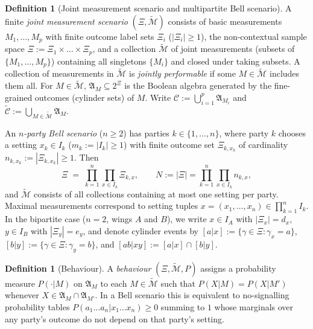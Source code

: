 \documentclass[11pt,a4paper]{article}
\theoremstyle{definition}
\newtheorem{definition}[theorem]{Definition}
\theoremstyle{remark}
\newcommand{\tcM}{\widetilde{\mathcal{M}}}
\newcommand{\cC}{\mathcal{C}}
\newcommand{\tcC}{\widetilde{\mathcal{C}}}
\newcommand{\EA}{\mathfrak{A}}
\begin{document}
\begin{definition}[Joint measurement scenario and multipartite Bell scenario]
A finite \emph{joint measurement scenario} $(\Xi, \tcM)$ consists of basic measurements $M_1, \dots, M_p$ with finite outcome label sets $\Xi_i$ ($|\Xi_i| \ge 1$), the non-contextual sample space $\Xi := \Xi_1 \times \dots \times \Xi_p$, and a collection $\tcM$ of joint measurements (subsets of $\{M_1,\dots,M_p\}$) containing all singletons $\{M_i\}$ and closed under taking subsets. A collection of measurements in $\tcM$ is \emph{jointly performable} if some $M \in \tcM$ includes them all. For $M \in \tcM$, $\EA_M \subseteq 2^{\Xi}$ is the Boolean algebra generated by the fine-grained outcomes (cylinder sets) of $M$. Write $\cC := \bigcup_{i=1}^p \EA_{M_i}$ and $\tcC := \bigcup_{M \in \tcM} \EA_M$.

An \emph{$n$-party Bell scenario} ($n \ge 2$) has parties $k \in \{1,\dots,n\}$, where party $k$ chooses a setting $x_k \in I_k$ ($m_k := |I_k| \ge 1$) with finite outcome set $\Xi_{k,x_k}$ of cardinality $n_{k,x_k} := |\Xi_{k,x_k}| \ge 1$. Then
\[
\Xi \;=\; \prod_{k=1}^n \prod_{x \in I_k} \Xi_{k,x}, \qquad N := |\Xi| = \prod_{k=1}^n \prod_{x \in I_k} n_{k,x},
\]
and $\tcM$ consists of all collections containing at most one setting per party. Maximal measurements correspond to setting tuples $x = (x_1,\dots,x_n) \in \prod_{k=1}^n I_k$. In the bipartite case ($n=2$, wings $A$ and $B$), we write $x \in I_A$ with $|\Xi_x| = d_x$, $y \in I_B$ with $|\Xi_y| = e_y$, and denote cylinder events by $[a|x] := \{\gamma \in \Xi : \gamma_x = a\}$, $[b|y] := \{\gamma \in \Xi : \gamma_y = b\}$, and $[ab|xy] := [a|x] \cap [b|y]$.
\end{definition}

\begin{definition}[Behaviour]
A \emph{behaviour} $(\Xi, \tcM, P)$ assigns a probability measure $P(\cdot | M)$ on $\EA_M$ to each $M \in \tcM$ such that $P(X|M) = P(X|M')$ whenever $X \in \EA_M \cap \EA_{M'}$. In a Bell scenario this is equivalent to no-signalling probability tables $P(a_1\dots a_n | x_1\dots x_n) \ge 0$ summing to $1$ whose marginals over any party's outcome do not depend on that party's setting.
\end{definition}
\end{document}
